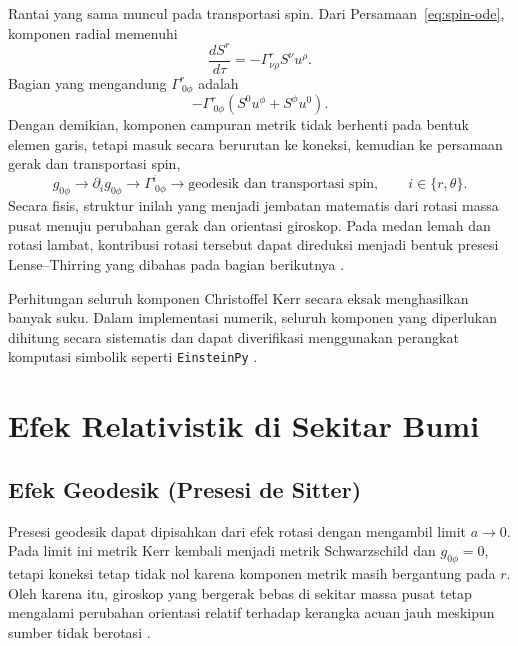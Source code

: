 Rantai yang sama muncul pada transportasi spin. Dari
Persamaan~\eqref{eq:spin-ode}, komponen radial memenuhi
\begin{equation}
    \frac{dS^r}{d\tau}
    =-\Gamma^r_{\nu\rho}S^\nu u^\rho.
\end{equation}
Bagian yang mengandung $\Gamma^r_{\ 0\phi}$ adalah
\begin{equation}
    -\Gamma^r_{\ 0\phi}
    \left(S^0u^\phi+S^\phi u^0\right).
    \label{eq:spin-rotation-term}
\end{equation}
Dengan demikian, komponen campuran metrik tidak berhenti pada bentuk elemen
garis, tetapi masuk secara berurutan ke koneksi, kemudian ke persamaan
gerak dan transportasi spin,
\begin{equation}
    g_{0\phi}
    \longrightarrow
    \partial_i g_{0\phi}
    \longrightarrow
    \Gamma^i_{\ 0\phi}
    \longrightarrow
    \text{geodesik dan transportasi spin},
    \qquad i\in\{r,\theta\}.
    \label{eq:gtphi-dynamics-chain}
\end{equation}
Secara fisis, struktur inilah yang menjadi jembatan matematis dari rotasi
massa pusat menuju perubahan gerak dan orientasi giroskop. Pada medan lemah
dan rotasi lambat, kontribusi rotasi tersebut dapat direduksi menjadi
bentuk presesi Lense--Thirring yang dibahas pada bagian berikutnya
\parencite{Carroll2004SpacetimeGeometry,Schutz2009FirstCourse}.

Perhitungan seluruh komponen Christoffel Kerr secara eksak menghasilkan
banyak suku. Dalam implementasi numerik, seluruh komponen yang diperlukan
dihitung secara sistematis dan dapat diverifikasi menggunakan perangkat
komputasi simbolik seperti \texttt{EinsteinPy} \parencite{Bapat2020EinsteinPy}.


\section{Efek Relativistik di Sekitar Bumi}
\label{sec:efek-relativistik}

\subsection{Efek Geodesik (Presesi de Sitter)}
\label{subsec:efek-geodesik}

Presesi geodesik dapat dipisahkan dari efek rotasi dengan mengambil limit
$a\rightarrow0$. Pada limit ini metrik Kerr kembali menjadi metrik
Schwarzschild dan $g_{0\phi}=0$, tetapi koneksi tetap tidak nol karena
komponen metrik masih bergantung pada $r$. Oleh karena itu, giroskop yang
bergerak bebas di sekitar massa pusat tetap mengalami perubahan orientasi
relatif terhadap kerangka acuan jauh meskipun sumber tidak berotasi
\parencite{Schutz2009FirstCourse,Will2014Confrontation}.

